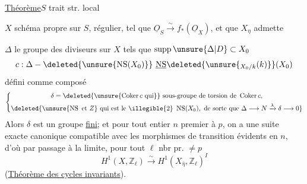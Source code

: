 
\uline{Théorème}\quad $S$ trait str. local

$X$ schéma propre sur $S$, régulier, tel que $\underline O_S\xrightarrow{\sim}f_*(\underline O_X)$, et que $X_\eta$ admette 

$\Delta$ le groupe des diviseurs sur $X$ tels que $\operatorname{supp}\unsure{\Delta|D}\subset X_0$
\[
c:\Delta\mathbin{-}\deleted{\unsure{\operatorname{NS}(X_0)}}\ \underline{\operatorname{NS}}\deleted{\unsure{{}_{X_0/k}(k)}}(X_0)
\]
défini comme composé
\[
\left\{\begin{gathered}
\delta=\deleted{\unsure{\operatorname{Coker}c\text{ qui}}}\ \text{sous-groupe de torsion de }\operatorname{Coker}c,\\
\deleted{\unsure{\operatorname{NS}\text{ et }Z}\ \text{qui est le}\ \illegible{2}\ \operatorname{NS}(X_0),\ \text{de sorte que }\Delta\longrightarrow N\xrightarrow{\lambda}\delta\longrightarrow0}
\end{gathered}\right.
\]
 Alors $\delta$ est un groupe \uline{fini};  et pour tout entier $n$ premier à $p$, on a une suite exacte canonique
compatible avec les morphismes de transition évidents en $n$, d'où par passage à la limite, pour tout $\ell$ nbr pr. $\neq p$
\[
H^1(X,\mathbb Z_\ell)\xrightarrow{\sim}H^1(X_{\bar\eta},\mathbb Z_\ell)^I
\]
(\uline{Théorème des cycles invariants}).

